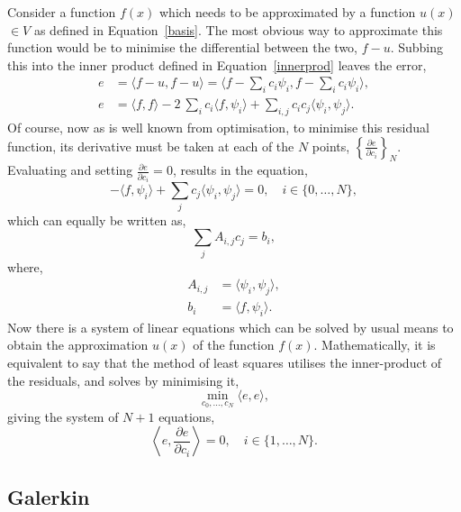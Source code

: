 Consider a function $f(x)$ which needs to be approximated by a function $u(x)$ $\in V$ as defined in Equation~\eqref{basis}. The most obvious way to approximate this function would be to minimise the differential between the two, $f-u$. Subbing this into the inner product defined in Equation~\eqref{innerprod} leaves the error,
\begin{align}
	e &= \langle f-u, f-u\rangle = \langle f-\sum_i c_i \psi_i,f-\sum_i c_i \psi_i\rangle,\\
	e &= \langle f,f\rangle - 2~\sum_i c_i\langle f,\psi_i\rangle + \sum_{i,j} c_i c_j \langle\psi_i, \psi_j\rangle. 
\end{align}
Of course, now as is well known from optimisation, to minimise this residual function, its derivative must be taken at each of the $N$ points, $\left\{\frac{\partial e}{\partial c_i}\right\}_N$. Evaluating and setting $\frac{\partial e}{\partial c_i} = 0$, results in the equation,
\begin{equation}
	- \langle f,\psi_i\rangle + \sum_j c_j\langle \psi_i, \psi_j\rangle = 0,\quad i \in \{0,\dots,N\},
\end{equation}
which can equally be written as,
\begin{equation}
	\sum_j A_{i,j}c_j = b_i,
\end{equation}
where,
\begin{align}
	A_{i,j} &= \langle \psi_i, \psi_j\rangle,\\
	b_i &= \langle f, \psi_i \rangle.
\end{align}
Now there is a system of linear equations which can be solved by usual means to obtain the approximation $u(x)$ of the function $f(x)$. Mathematically, it is equivalent to say that the method of least squares utilises the inner-product of the residuals, and solves by minimising it,
\begin{equation}
	\min_{c_0,\dots,c_N} \langle e, e\rangle,
\end{equation}
giving the system of $N+1$ equations,
\begin{equation}
	\left\langle e, \frac{\partial e}{\partial c_i}\right\rangle = 0, \quad i\in\{1,\dots,N\}.
\end{equation}

\subsection{Galerkin}


